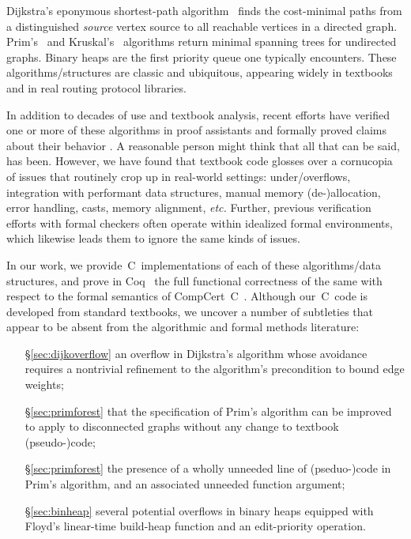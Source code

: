 Dijkstra's eponymous shortest-path algorithm~\cite{DBLP:journals/nm/Dijkstra59} finds
the cost-minimal paths from a distinguished \emph{source} vertex
source to all reachable vertices in a directed graph. Prim's~\cite{prim2:prim} and Kruskal's~\cite{kruskal} algorithms return minimal spanning trees for undirected graphs.  Binary heaps are the first priority queue one typically encounters.
These algorithms/structures are classic and ubiquitous, appearing widely in textbooks~\cite{clrs,DBLP:books/daglib/0022194,heineman2008algorithms,rozen,kepnergilbert,sedgewick} and in real routing protocol libraries.

In addition to decades of use and textbook analysis, recent efforts have verified one or more of these algorithms in proof
assistants and formally proved claims about their behavior \cite{chen2003dijkstra,Moore2005,arthur,DBLP:journals/afp/LammichN19,DBLP:conf/ictac/Guttmann16}.  A reasonable person might think that all
that can be said, has been.  However, we have found that
textbook code glosses over a cornucopia
of issues that routinely crop up in real-world settings: under/overflows, integration with performant data structures, manual memory (de-)allocation,
error handling, casts, memory alignment, \emph{etc.} Further, previous verification efforts with formal checkers often operate
within idealized formal environments, which likewise leads them to ignore the same kinds of issues.

In our work, we provide~C~implementations of each of these algorithms/data structures, and prove in Coq~\cite{Coq} the full functional correctness of the same with respect to
the formal semantics of CompCert~C~\cite{leroy:compcert}.  Although our~C~code is developed from standard textbooks, we uncover a number of subtleties
that appear to be absent from the algorithmic and formal methods literature:

\begin{itemize}
\item[\S\ref{sec:dijkoverflow}] an overflow in Dijkstra's algorithm whose avoidance requires a nontrivial refinement to the algorithm's precondition to bound edge weights;
\item[\S\ref{sec:primforest}] that the specification of Prim's algorithm can be improved to apply to disconnected graphs without any change to textbook (pseudo-)code;
\item[\S\ref{sec:primforest}] the presence of a wholly unneeded line of (pseduo-)code in Prim's algorithm, and an associated unneeded function argument;
\item[\S\ref{sec:binheap}] several potential overflows in binary heaps equipped with Floyd's linear-time build-heap function and an edit-priority operation.
\end{itemize}

